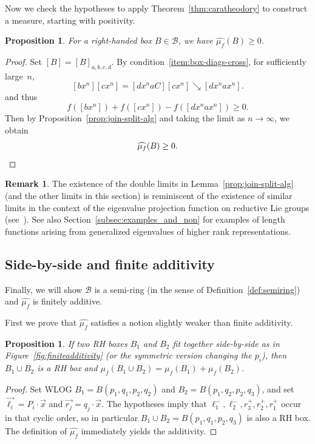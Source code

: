 \documentclass[11pt]{amsart}
\newcommand{\ora}[1]{\overrightarrow{#1}}
\numberwithin{equation}{section}
\numberwithin{figure}{section}
\newtheorem{proposition}[theorem]{Proposition}
\theoremstyle{definition}
\newtheorem{remark}[theorem]{Remark}
\theoremstyle{plain}
\newcommand*{\wh}[1]{\widehat{#1}}
\newcommand{\reducesto}{\mathrel{\searrow}}
\begin{document}
Now we check the hypotheses to apply
 Theorem~\ref{thm:caratheodory} to construct a measure, starting with positivity.

\begin{proposition}
  \label{prop:box-positive}
  For a right-handed
  box $B\in \mathcal{B}$, we have $\wh{\mu_f}(B) \geq 0$.
\end{proposition}

\begin{proof}
  Set $[B] = [B]_{a,b,c,d}$.
  By condition~\ref{item:box-diags-cross}, for sufficiently large~$n$,
  \[
    [bx^n][cx^n] = [dx^naC][cx^n] \reducesto [dx^nax^n].
  \]
  and thus
\[
f([bx^n]) + f([cx^n]) -f([dx^nax^n]) \geq 0.
\]
  Then by Proposition~\ref{prop:join-split-alg} and taking the
  limit as $n \to \infty$, we obtain
  \[
  \wh{\mu_f}(B) \geq 0. \qedhere
  \]
\end{proof}

\begin{remark} 
 The existence of the double limits in Lemma~\ref{prop:join-split-alg} (and the other limits in this section) is reminiscent of the existence of
 similar limits in the context of the eigenvalue projection function
 on reductive Lie groups (see~\cite[Lemma~7.10]{BQ16:Random}). See also Section~\ref{subsec:examples_and_non} for examples of length functions arising from generalized eigenvalues of higher rank representations.
 \end{remark}
 
\subsection{Side-by-side and finite additivity}

Finally, we will show $\mathcal{B}$ is
a semi-ring (in the sense of Definition~\ref{def:semiring}) and
$\wh{\mu_f}$ is finitely additive.

First we prove that $\wh{\mu_f}$ satisfies a notion slightly weaker than finite additivity.

\begin{proposition}
  If two RH boxes $B_1$ and $B_2$ fit together side-by-side as in
  Figure~\ref{fig:finiteadditivity} (or the symmetric version changing
  the $p_i$), then $B_1 \cup B_2$ is a RH box
  and $\mu_f(B_1 \cup B_2) = \mu_f(B_1) + \mu_f(B_2)$.
  \label{prop:sidebyside}
\end{proposition}

\begin{proof}
  Set WLOG $B_1 = 
  B(p_1,q_1,p_2,q_2)$ and $B_2 =
  B(p_1,q_2,p_2,q_3)$, and set $\ora{\ell_i} = P_i \cdot \ora x$ and
  $\ora{r_j} = q_j \cdot \ora{x}$. The hypotheses imply that
  $\ell_1^-,\ell_2^-,r_3^+, r_2^+, r_1^+$ occur in that cyclic order,
  so in particular $B_1 \cup B_2 = B(p_1,q_1,p_2,q_3)$ is also a
  RH box. The definition of $\wh{\mu_f}$ immediately yields the additivity.
\end{proof}
\end{document}
